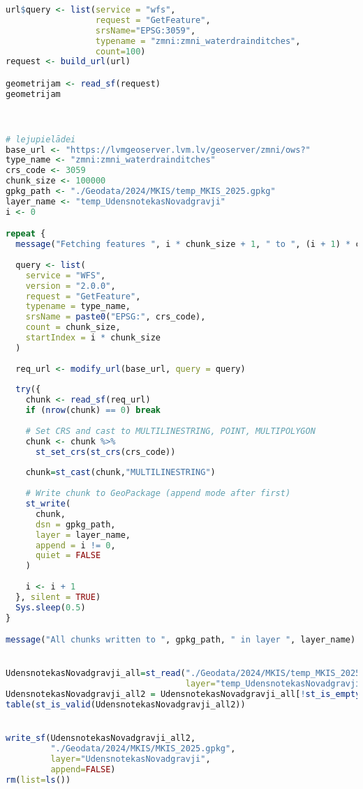 \documentclass[
]{book}
\begin{document}
\begin{lstlisting}[language=R]
url$query <- list(service = "wfs",
                  request = "GetFeature",
                  srsName="EPSG:3059",
                  typename = "zmni:zmni_waterdrainditches",
                  count=100)
request <- build_url(url)

geometrijam <- read_sf(request)
geometrijam



# lejupielādei
base_url <- "https://lvmgeoserver.lvm.lv/geoserver/zmni/ows?"
type_name <- "zmni:zmni_waterdrainditches"
crs_code <- 3059
chunk_size <- 100000
gpkg_path <- "./Geodata/2024/MKIS/temp_MKIS_2025.gpkg"
layer_name <- "temp_UdensnotekasNovadgravji"
i <- 0

repeat {
  message("Fetching features ", i * chunk_size + 1, " to ", (i + 1) * chunk_size, "...")
  
  query <- list(
    service = "WFS",
    version = "2.0.0",
    request = "GetFeature",
    typename = type_name,
    srsName = paste0("EPSG:", crs_code),
    count = chunk_size,
    startIndex = i * chunk_size
  )
  
  req_url <- modify_url(base_url, query = query)
  
  try({
    chunk <- read_sf(req_url)
    if (nrow(chunk) == 0) break
    
    # Set CRS and cast to MULTILINESTRING, POINT, MULTIPOLYGON
    chunk <- chunk %>%
      st_set_crs(st_crs(crs_code))
    
    chunk=st_cast(chunk,"MULTILINESTRING")
    
    # Write chunk to GeoPackage (append mode after first)
    st_write(
      chunk, 
      dsn = gpkg_path,
      layer = layer_name,
      append = i != 0,
      quiet = FALSE
    )
    
    i <- i + 1
  }, silent = TRUE)
  Sys.sleep(0.5)
}

message("All chunks written to ", gpkg_path, " in layer ", layer_name)


UdensnotekasNovadgravji_all=st_read("./Geodata/2024/MKIS/temp_MKIS_2025.gpkg",
                                    layer="temp_UdensnotekasNovadgravji")
UdensnotekasNovadgravji_all2 = UdensnotekasNovadgravji_all[!st_is_empty(UdensnotekasNovadgravji_all),,drop=FALSE] # 0
table(st_is_valid(UdensnotekasNovadgravji_all2))


write_sf(UdensnotekasNovadgravji_all2,
         "./Geodata/2024/MKIS/MKIS_2025.gpkg",
         layer="UdensnotekasNovadgravji",
         append=FALSE)
rm(list=ls())





\end{lstlisting}
\end{document}
